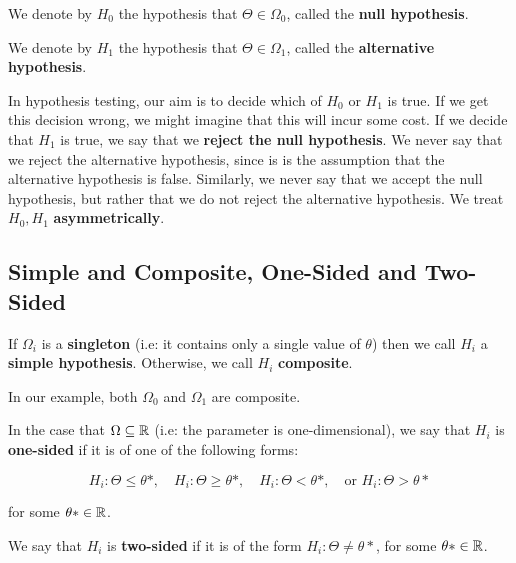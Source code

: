 \documentclass[a4paper]{article}
\begin{document}
            \begin{definition}
                We denote by $H_0$ the hypothesis that $\Theta \in \Omega_0$,
                called the \textbf{null hypothesis}.

                We denote by $H_1$ the hypothesis that $\Theta \in \Omega_1$,
                called the \textbf{alternative hypothesis}.
            \end{definition}

            In hypothesis testing, our aim is to decide which of $H_0$ or $H_1$
            is true. If we get this decision wrong, we might imagine that this
            will incur some cost. If we decide that $H_1$ is true, we say that
            we \textbf{reject the null hypothesis}. We never say that we reject
            the alternative hypothesis, since is is the assumption that the
            alternative hypothesis is false. Similarly, we never say that we
            accept the null hypothesis, but rather that we do not reject the
            alternative hypothesis. We treat $H_0, H_1$ \textbf{asymmetrically}.

        \subsection{Simple and Composite, One-Sided and Two-Sided}
            \begin{definition}
                If $\Omega_i$ is a \textbf{singleton} (i.e: it contains only a
                single value of $\theta$) then we call $H_i$ a \textbf{simple
                hypothesis}. Otherwise, we call $H_i$ \textbf{composite}.
            \end{definition}

            In our example, both $\Omega_0$ and $\Omega_1$ are composite.

            \begin{definition}
                In the case that $\Omega \subseteq \mathbb{R}$ (i.e: the parameter is
                one-dimensional), we say that $H_i$ is \textbf{one-sided} if it
                is of one of the following forms:

                \[
                    H_i: \Theta \leq \theta*, \quad H_i: \Theta \geq \theta*,
                    \quad H_i: \Theta < \theta*, \quad \text{or } H_i: \Theta >
                    \theta*
                \]

                for some $\theta* \in \mathbb{R}$.

                We say that $H_i$ is \textbf{two-sided} if it is of the form
                $H_i: \Theta \neq \theta*$, for some $\theta* \in \mathbb{R}$.
            \end{definition}
\end{document}
